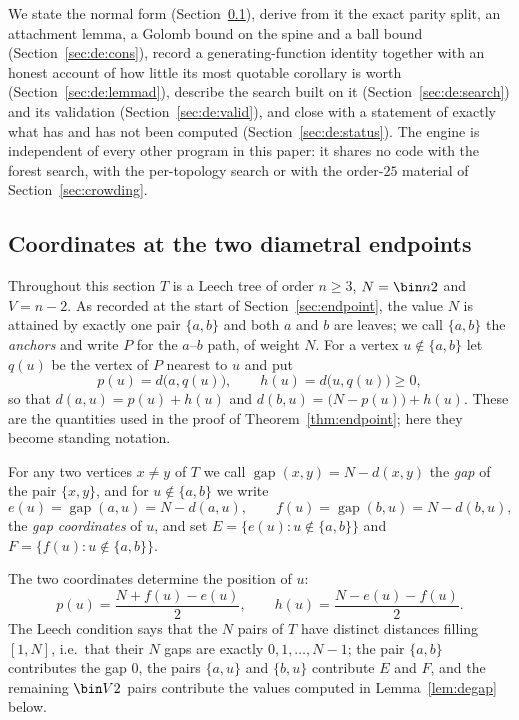 We state the normal form (Section~\ref{sec:de:setup}), derive from it the exact
parity split, an attachment lemma, a Golomb bound on the spine and a ball bound
(Section~\ref{sec:de:cons}), record a generating-function identity together
with an honest account of how little its most quotable corollary is worth
(Section~\ref{sec:de:lemmad}), describe the search built on it
(Section~\ref{sec:de:search}) and its validation
(Section~\ref{sec:de:valid}), and close with a statement of exactly what has
and has not been computed (Section~\ref{sec:de:status}).  The engine is
independent of every other program in this paper: it shares no code with the
forest search, with the per-topology search or with the order-$25$ material of
Section~\ref{sec:crowding}.

\subsection{Coordinates at the two diametral endpoints}\label{sec:de:setup}

Throughout this section $T$ is a Leech tree of order $n\ge3$, $N=\bin n2$ and
$V=n-2$.  As recorded at the start of Section~\ref{sec:endpoint}, the value $N$
is attained by exactly one pair $\{a,b\}$ and both $a$ and $b$ are leaves; we
call $\{a,b\}$ the \emph{anchors} and write $P$ for the $a$--$b$ path, of weight
$N$.  For a vertex $u\notin\{a,b\}$ let $q(u)$ be the vertex of $P$ nearest to
$u$ and put
\[
  p(u)=d\bigl(a,q(u)\bigr),\qquad h(u)=d\bigl(u,q(u)\bigr)\ge0,
\]
so that $d(a,u)=p(u)+h(u)$ and $d(b,u)=\bigl(N-p(u)\bigr)+h(u)$.  These are the
quantities used in the proof of Theorem~\ref{thm:endpoint}; here they become
standing notation.

For any two vertices $x\ne y$ of $T$ we call
$\operatorname{gap}(x,y)=N-d(x,y)$ the \emph{gap} of the pair $\{x,y\}$, and for
$u\notin\{a,b\}$ we write
\[
  e(u)=\operatorname{gap}(a,u)=N-d(a,u),\qquad
  f(u)=\operatorname{gap}(b,u)=N-d(b,u),
\]
the \emph{gap coordinates} of $u$, and set $E=\{e(u):u\notin\{a,b\}\}$ and
$F=\{f(u):u\notin\{a,b\}\}$.

The two coordinates determine the position of $u$:
\begin{equation}\label{eq:deph}
  p(u)=\frac{N+f(u)-e(u)}2,\qquad h(u)=\frac{N-e(u)-f(u)}2 .
\end{equation}
The Leech condition says that the $N$ pairs of $T$ have distinct distances
filling $[1,N]$, i.e.\ that their $N$ gaps are exactly $0,1,\dots,N-1$; the
pair $\{a,b\}$ contributes the gap $0$, the pairs $\{a,u\}$ and $\{b,u\}$
contribute $E$ and $F$, and the remaining $\bin V2$ pairs contribute the values
computed in Lemma~\ref{lem:degap} below.

